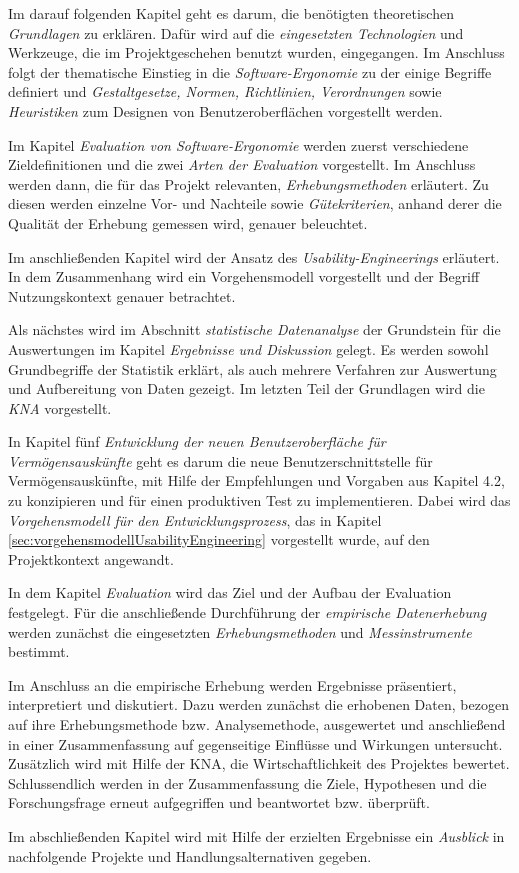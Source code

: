 Im darauf folgenden Kapitel geht es darum, die benötigten theoretischen \textit{Grundlagen} zu erklären. Dafür wird auf die \textit{eingesetzten Technologien} und Werkzeuge, die im Projektgeschehen benutzt wurden, eingegangen. Im Anschluss folgt der thematische Einstieg in die \textit{Software-Ergonomie} zu der einige Begriffe definiert und \textit{Gestaltgesetze, Normen, Richtlinien, Verordnungen} sowie \textit{Heuristiken} zum Designen von Benutzeroberflächen vorgestellt werden. 

Im Kapitel \textit{Evaluation von Software-Ergonomie} werden zuerst verschiedene Zieldefinitionen und die zwei \textit{Arten der Evaluation} vorgestellt. Im Anschluss werden dann, die für das Projekt relevanten, \textit{Erhebungsmethoden} erläutert. Zu diesen werden einzelne Vor- und Nachteile sowie \textit{Gütekriterien}, anhand derer die Qualität der Erhebung gemessen wird, genauer beleuchtet. 

Im anschließenden Kapitel wird der Ansatz des \textit{Usability-Engineerings} erläutert. In dem Zusammenhang wird ein Vorgehensmodell vorgestellt und der Begriff Nutzungskontext genauer betrachtet. 

Als nächstes wird im Abschnitt \textit{statistische Datenanalyse} der Grundstein für die Auswertungen im Kapitel \textit{Ergebnisse und Diskussion} gelegt. Es werden sowohl Grundbegriffe der Statistik erklärt, als auch mehrere Verfahren zur Auswertung und Aufbereitung von Daten gezeigt. Im letzten Teil der Grundlagen wird die \textit{\gls{KNA}} vorgestellt.

In Kapitel fünf \textit{Entwicklung der neuen Benutzeroberfläche für Vermögensauskünfte} geht es darum die neue Benutzerschnittstelle für Vermögensauskünfte, mit Hilfe der Empfehlungen und Vorgaben aus Kapitel 4.2, zu konzipieren und für einen produktiven Test zu implementieren. Dabei wird das \textit{Vorgehensmodell für den Entwicklungsprozess}, das in Kapitel \ref{sec:vorgehensmodellUsabilityEngineering} vorgestellt wurde, auf den Projektkontext angewandt.

In dem Kapitel \textit{Evaluation} wird das Ziel und der Aufbau der Evaluation festgelegt. Für die anschließende Durchführung der \textit{empirische Datenerhebung} werden zunächst die eingesetzten \textit{Erhebungsmethoden} und \textit{Messinstrumente} bestimmt.

Im Anschluss an die empirische Erhebung werden Ergebnisse präsentiert, interpretiert und diskutiert. Dazu werden zunächst die erhobenen Daten, bezogen auf ihre Erhebungsmethode bzw. Analysemethode, ausgewertet und anschließend in einer Zusammenfassung auf gegenseitige Einflüsse und Wirkungen untersucht. Zusätzlich wird mit Hilfe der \gls{KNA}, die Wirtschaftlichkeit des Projektes bewertet. Schlussendlich werden in der Zusammenfassung die Ziele, Hypothesen und die Forschungsfrage erneut aufgegriffen und beantwortet bzw. überprüft.

Im abschließenden Kapitel wird mit Hilfe der erzielten Ergebnisse ein \textit{Ausblick} in nachfolgende Projekte und Handlungsalternativen gegeben.



